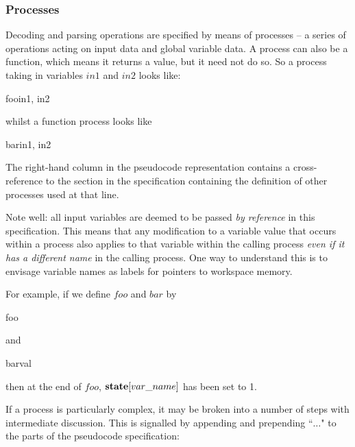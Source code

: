 \subsubsection{Processes}
\label{functionsprocesses}

Decoding and parsing operations are specified by means of processes
 -- a series of operations acting on input data and global variable data. 
A process can also be a function, which means it returns a value, but
it need not do so. So a process
taking in variables $in1$ and $in2$ looks like:

\begin{pseudo}{foo}{in1, in2}
\bsCODE{\hdots}
\end{pseudo}

whilst a function process looks like

\begin{pseudo}{bar}{in1, in2}
\bsCODE{\hdots}
\end{pseudo}

The right-hand column in the pseudocode representation contains a cross-reference to the 
section in the specification containing the definition of other processes used at that line.

Note well: all input variables are deemed to be passed {\em by reference} in this
specification. This means that any modification to a variable value that
occurs within a process also applies to that variable within the calling process
{\em even if it has a different name} in the calling process. One way to understand
this is to envisage variable names as labels for pointers to workspace memory.

For example, if we define $foo$ and $bar$ by

\begin{pseudo}{foo}{}
\end{pseudo}

and 

\begin{pseudo}{bar}{val}
\end{pseudo}

then at the end of $foo$, $\textbf{state}[var\_name]$ has been set to 1.

If a process is particularly complex, it may be broken into a number of steps with 
intermediate discussion. This is signalled by appending  and prepending ``$\hdots$" to
the parts of the pseudocode specification:

